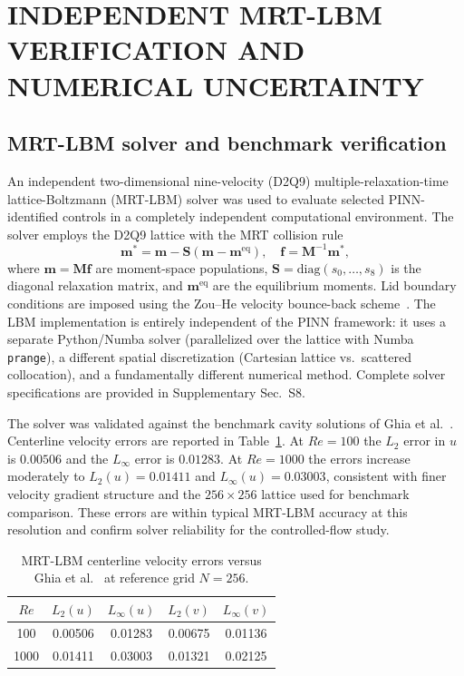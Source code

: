 \documentclass[a4paper,11pt]{article}
\begin{document}
\section{INDEPENDENT MRT-LBM VERIFICATION AND NUMERICAL UNCERTAINTY}
\label{sec:lbm}

\subsection{MRT-LBM solver and benchmark verification}

An independent two-dimensional nine-velocity (D2Q9) multiple-relaxation-time
lattice-Boltzmann (MRT-LBM) solver was used to evaluate selected PINN-identified
controls in a completely independent computational environment. The solver employs the D2Q9 lattice with the
MRT collision rule
\begin{equation}
\mathbf{m}^*=\mathbf{m}-\mathbf{S}(\mathbf{m}-\mathbf{m}^{\mathrm{eq}}),
\quad\mathbf{f}=\mathbf{M}^{-1}\mathbf{m}^*,
\end{equation}
where \(\mathbf{m}=\mathbf{M}\mathbf{f}\) are moment-space populations,
\(\mathbf{S}=\mathrm{diag}(s_0,\ldots,s_8)\) is the diagonal relaxation matrix,
and \(\mathbf{m}^{\mathrm{eq}}\) are the equilibrium moments. Lid boundary conditions
are imposed using the Zou--He velocity bounce-back scheme~\cite{pan2006high,chen1998lattice}.
The LBM implementation is entirely independent of the PINN framework: it uses a
separate Python/Numba solver (parallelized over the lattice with Numba
\texttt{prange}), a different spatial discretization (Cartesian lattice
vs.\ scattered collocation), and a fundamentally different numerical method.
Complete solver specifications are provided in Supplementary Sec.~S8.

The solver was validated against the benchmark cavity solutions of Ghia et al.\
\cite{ghia1982high}. Centerline velocity errors are reported in
Table~\ref{tab:ghia_verification}. At \(Re=100\) the \(L_2\) error in
\(u\) is \(0.00506\) and the \(L_\infty\) error is \(0.01283\). At \(Re=1000\)
the errors increase moderately to \(L_2(u)=0.01411\) and \(L_\infty(u)=0.03003\),
consistent with finer velocity gradient structure and the \(256\times256\) lattice
used for benchmark comparison. These errors are within typical MRT-LBM accuracy
at this resolution and confirm solver reliability for the controlled-flow study.

\begin{table}[t]
\centering
\caption{MRT-LBM centerline velocity errors versus Ghia et al.\
\protect\cite{ghia1982high} at reference grid \(N=256\).}
\label{tab:ghia_verification}
\small
\begin{tabular}{ccccc}
\toprule
\(Re\) & \(L_2(u)\) & \(L_\infty(u)\) & \(L_2(v)\) & \(L_\infty(v)\)\\
\midrule
100  & 0.00506 & 0.01283 & 0.00675 & 0.01136\\
1000 & 0.01411 & 0.03003 & 0.01321 & 0.02125\\
\bottomrule
\end{tabular}
\end{table}
\end{document}
